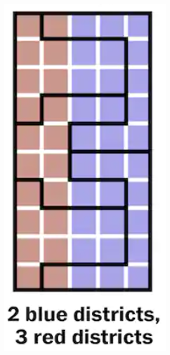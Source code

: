 \documentclass[red]{beamer}
\begin{document}
\begin{frame} [t]
\begin{columns}
\begin{column}{0.35\textwidth}
    \includegraphics[scale = .5]{packing.png}
    \end{column}
    \end{columns}
    \end{frame}

\end{document}

